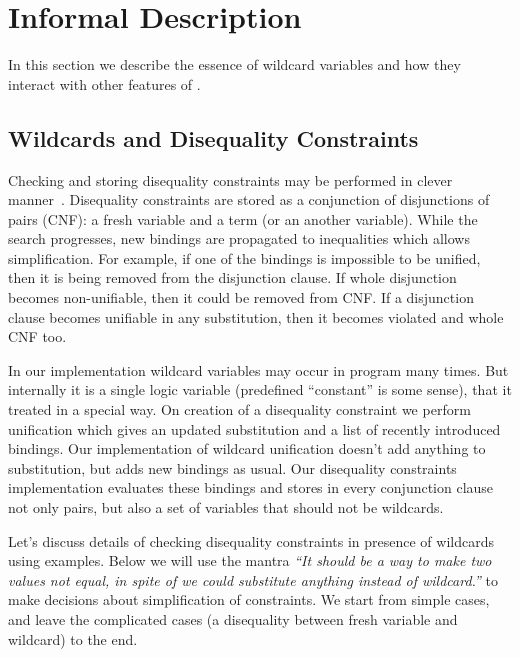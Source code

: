 
\section{Informal Description}
\label{sec:theory}

In this section we describe the essence of wildcard variables and how they interact with other features of \miniKanren{}.

\subsection{Wildcards and Disequality Constraints}
Checking and storing disequality constraints may be performed in clever manner~\cite{fasterMK}.
Disequality constraints are stored as a conjunction of disjunctions of pairs (CNF): a fresh variable and a term (or an another variable).
While the search  progresses, new bindings are propagated to inequalities which allows simplification.
For example, if one of the bindings is impossible to be unified, then it is being removed from the disjunction clause.
If whole disjunction  becomes non-unifiable, then it could be removed from CNF.
If a disjunction clause becomes unifiable in any substitution, then it becomes violated and whole CNF too.

In our implementation wildcard variables may occur in program many times. But internally it is a single logic variable (predefined ``constant'' is some sense), that it treated in a special way. On creation of a disequality constraint we perform unification which gives an updated substitution and a list of recently introduced bindings. Our implementation of wildcard unification doesn't add anything to substitution, but adds new bindings as usual. Our disequality constraints implementation evaluates these bindings and stores in every conjunction clause not only pairs, but also a set of variables that should not be wildcards.

Let's discuss details of checking disequality constraints in presence of wildcards using examples. Below we will use the mantra \emph{``It should be a way to make two values not equal, in spite of we could substitute anything instead of wildcard.''} to make decisions about simplification of constraints. We start from simple cases, and leave the complicated cases (a disequality between fresh variable and wildcard) to the end.

